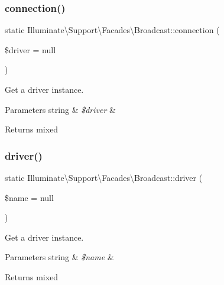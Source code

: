 \subsubsection{\texorpdfstring{connection()}{connection()}}
{\footnotesize\ttfamily static Illuminate\textbackslash{}\+Support\textbackslash{}\+Facades\textbackslash{}\+Broadcast\+::connection (\begin{DoxyParamCaption}\item[{}]{\$driver = {\ttfamily null} }\end{DoxyParamCaption})\hspace{0.3cm}{\ttfamily [static]}}

Get a driver instance.


\begin{DoxyParams}[1]{Parameters}
string & {\em \$driver} & \\
\hline
\end{DoxyParams}
\begin{DoxyReturn}{Returns}
mixed 
\end{DoxyReturn}
\mbox{\label{class_illuminate_1_1_support_1_1_facades_1_1_broadcast_a9bdbd5d1fd001e1a5ef02b4003f8d552}} 
\subsubsection{\texorpdfstring{driver()}{driver()}}
{\footnotesize\ttfamily static Illuminate\textbackslash{}\+Support\textbackslash{}\+Facades\textbackslash{}\+Broadcast\+::driver (\begin{DoxyParamCaption}\item[{}]{\$name = {\ttfamily null} }\end{DoxyParamCaption})\hspace{0.3cm}{\ttfamily [static]}}

Get a driver instance.


\begin{DoxyParams}[1]{Parameters}
string & {\em \$name} & \\
\hline
\end{DoxyParams}
\begin{DoxyReturn}{Returns}
mixed 
\end{DoxyReturn}
\mbox{\label{class_illuminate_1_1_support_1_1_facades_1_1_broadcast_af0187828ad8e637972903b98eb345b70}} 
